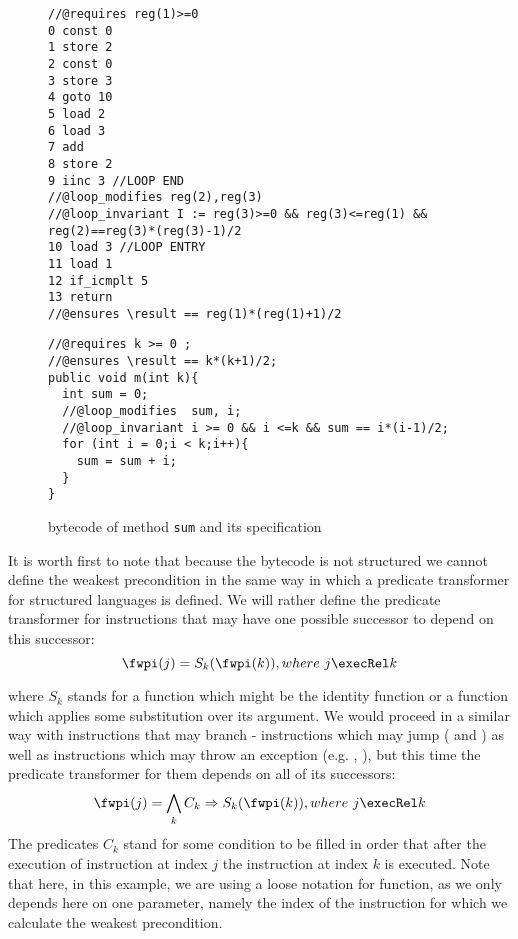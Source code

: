   
\begin{figure}[ht!]
\begin{center}
\begin{minipage}[c]{\linewidth} 
\begin{minipage}[c]{\linewidth}
\scriptsize{
\begin{lstlisting}[frame=trbl]
//@requires reg(1)>=0
0 const 0
1 store 2
2 const 0
3 store 3
4 goto 10
5 load 2
6 load 3
7 add
8 store 2
9 iinc 3 //LOOP END
//@loop_modifies reg(2),reg(3)
//@loop_invariant I := reg(3)>=0 && reg(3)<=reg(1) && reg(2)==reg(3)*(reg(3)-1)/2
10 load 3 //LOOP ENTRY 
11 load 1
12 if_icmplt 5 
13 return
//@ensures \result == reg(1)*(reg(1)+1)/2
\end{lstlisting}} 
\end{minipage}


\begin{minipage}[c]{\linewidth} 
\scriptsize{
\begin{lstlisting}[frame=trbl]
//@requires k >= 0 ;
//@ensures \result == k*(k+1)/2;
public void m(int k){
  int sum = 0;
  //@loop_modifies  sum, i;
  //@loop_invariant i >= 0 && i <=k && sum == i*(i-1)/2;
  for (int i = 0;i < k;i++){
    sum = sum + i;
  } 
}
\end{lstlisting} }
\end{minipage}
\end{minipage}
\end{center}
\caption{\sc  bytecode of method \lstinline!sum! and its specification }
\label{wp:example:sum}
\end{figure}


 It is worth first to note that because the bytecode is not structured we cannot define
 the weakest precondition in the same way in which a predicate transformer for structured
 languages is defined.  
 We will rather  define the predicate transformer for  instructions that may have one possible successor to depend on
 this successor:
$$\fwpi( j ) =  S_k(\fwpi( k )) , where  \ j \execRel k $$

where $S_k$ stands for a function which might be the identity function or a function which applies some substitution over its argument.
 We would proceed in a similar way with instructions that may branch - instructions which may jump (\goto{} and \ifCond{}) as well as instructions
 which may throw an exception (e.g. \putfield, \arrstore), but this time the predicate transformer for them depends on all of its successors:
$$\fwpi( j ) = \bigwedge_k  C_k \Rightarrow S_k(\fwpi( k )) , where  \ j \execRel k $$
The predicates $C_k$ stand for some condition to be filled in order that after the execution of instruction at index $j$ the instruction at index $k$ is executed.
Note that here, in this example, we are using a loose notation for \wpName{}  function, as we only depends here on one parameter, namely the index
of the instruction for which we calculate the weakest precondition.

